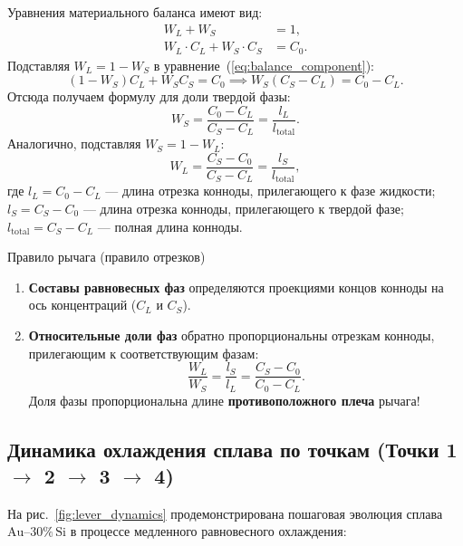 \documentclass[12pt,a4paper]{article}
\begin{document}
Уравнения материального баланса имеют вид:
\begin{align}
W_L + W_S &= 1, \label{eq:balance_total}\\
W_L \cdot C_L + W_S \cdot C_S &= C_0. \label{eq:balance_component}
\end{align}
Подставляя $W_L = 1 - W_S$ в уравнение~(\ref{eq:balance_component}):
\begin{equation}
(1 - W_S) C_L + W_S C_S = C_0 \implies W_S (C_S - C_L) = C_0 - C_L.
\end{equation}
Отсюда получаем формулу для доли твердой фазы:
\begin{equation}
W_S = \frac{C_0 - C_L}{C_S - C_L} = \frac{l_L}{l_{\mathrm{total}}}.
\label{eq:lever_ws}
\end{equation}
Аналогично, подставляя $W_S = 1 - W_L$:
\begin{equation}
W_L = \frac{C_S - C_0}{C_S - C_L} = \frac{l_S}{l_{\mathrm{total}}},
\label{eq:lever_wl}
\end{equation}
где $l_L = C_0 - C_L$ --- длина отрезка конноды, прилегающего к фазе жидкости; $l_S = C_S - C_0$ --- длина отрезка конноды, прилегающего к твердой фазе; $l_{\mathrm{total}} = C_S - C_L$ --- полная длина конноды.

\begin{lawbox}{Правило рычага (правило отрезков)}
\begin{enumerate}
    \item \textbf{Составы равновесных фаз} определяются проекциями концов конноды на ось концентраций ($C_L$ и $C_S$).
    \item \textbf{Относительные доли фаз} обратно пропорциональны отрезкам конноды, прилегающим к соответствующим фазам:
    \begin{equation}
    \frac{W_L}{W_S} = \frac{l_S}{l_L} = \frac{C_S - C_0}{C_0 - C_L}.
    \label{eq:lever_ratio}
    \end{equation}
    Доля фазы пропорциональна длине \textbf{противоположного плеча} рычага!
\end{enumerate}
\end{lawbox}

\subsection{Динамика охлаждения сплава по точкам (Точки 1 $\to$ 2 $\to$ 3 $\to$ 4)}
На рис.~\ref{fig:lever_dynamics} продемонстрирована пошаговая эволюция сплава $\mathrm{Au\text{--}30\%\,Si}$ в процессе медленного равновесного охлаждения:
\end{document}
